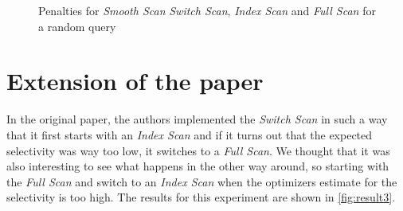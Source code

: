 \documentclass[a4paper,11pt,twoside]{article}
\begin{document}
\begin{figure}[ht!]
\centering
{}
\quad
{}

\quad
{}
%		
\caption{Penalties for  \textit{Smooth Scan} \textit{Switch Scan}, \textit{Index Scan} and \textit{Full Scan} for a random query}
\label{fig:result2}
\end{figure}

\section{Extension of the paper}\label{sec:extension}
In the original paper, the authors implemented the \textit{Switch Scan} in such a way that it first starts with an \textit{Index Scan} and if it turns out that the expected selectivity was way too low, it switches to a \textit{Full Scan}. We thought that it was also interesting to see what happens in the other way around, so starting with the \textit{Full Scan} and switch to an \textit{Index Scan} when the optimizers estimate for the selectivity is too high. The results for this experiment are shown in \autoref{fig:result3}.
\end{document}
